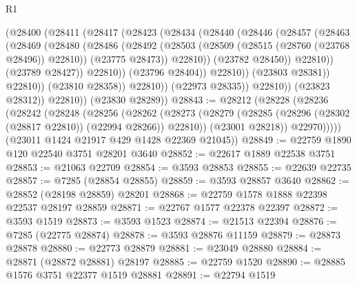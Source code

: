 \begin{lexlean}{R1}
\begin{coremodule}
                          (@28400
                            (@28411
                              (@28417
                                (@28423
                                  (@28434
                                    (@28440
                                      (@28446
                                        (@28457
                                          (@28463
                                            (@28469
                                              (@28480
                                                (@28486
                                                  (@28492
                                                    (@28503
                                                      (@28509
                                                        (@28515 (@28760 (@23768 @28496)) @22810))
                                                      (@23775 @28473))
                                                    @22810))
                                                (@23782 @28450))
                                              @22810))
                                          (@23789 @28427))
                                        @22810))
                                    (@23796 @28404))
                                  @22810))
                              (@23803 @28381))
                            @22810))
                        (@23810 @28358))
                      @22810))
                  (@22973 @28335))
                @22810))
            (@23823 @28312))
          @22810))
      (@23830 @28289))
@28843 := @28212
    (@28228
      (@28236
        (@28242
          (@28248
            (@28256
              (@28262
                (@28273
                  (@28279 (@28285 (@28296 (@28302 (@28817 @22810)) (@22994 @28266)) @22810))
                  (@23001 @28218))
                @22970)))))
      (@23011 @1424 @21917 @429 @1428 @22369 @21045))
@28849 := @22759 @1890 @120 @22540 @3751 @28201 @3640
@28852 := @22617 @1889 @22538 @3751
@28853 := @21063 @22709
@28854 := @3593 @28853
@28855 := @22639 @22735
@28857 := @7285 (@28854 @28855)
@28859 := @3593 @28857 @3640
@28862 := @28852 (@28198 @28859) @28201
@28868 := @22759 @1578 @1888 @22398 @22537 @28197 @28859
@28871 := @22767 @1577 @22378 @22397
@28872 := @3593 @1519
@28873 := @3593 @1523
@28874 := @21513 @22394
@28876 := @7285 (@22775 @28874)
@28878 := @3593 @28876 @11159
@28879 := @28873 @28878
@28880 := @22773 @28879
@28881 := @23049 @28880
@28884 := @28871 (@28872 @28881) @28197
@28885 := @22759 @1520
@28890 := @28885 @1576 @3751 @22377 @1519 @28881
@28891 := @22794 @1519

\end{coremodule}
\end{lexlean}

